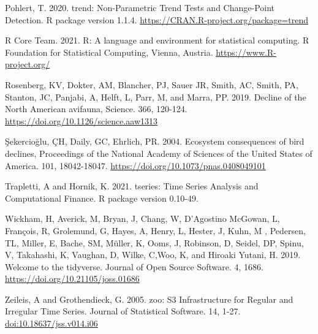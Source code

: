 \documentclass[
  12pt,
]{article}
\begin{document}
Pohlert, T. 2020. trend: Non-Parametric Trend Tests and Change-Point
Detection. R package version 1.1.4.
\url{https://CRAN.R-project.org/package=trend}

R Core Team. 2021. R: A language and environment for statistical
computing. R Foundation for Statistical Computing, Vienna, Austria.
\url{https://www.R-project.org/}

Rosenberg, KV, Dokter, AM, Blancher, PJ, Sauer JR, Smith, AC, Smith, PA,
Stanton, JC, Panjabi, A, Helft, L, Parr, M, and Marra, PP. 2019. Decline
of the North American avifauna, Science. 366, 120-124.
\url{https://doi.org/10.1126/science.aaw1313}

Şekercioğlu, ÇH, Daily, GC, Ehrlich, PR. 2004. Ecosystem consequences of
bird declines, Proceedings of the National Academy of Sciences of the
United States of America. 101, 18042-18047.
\url{https://doi.org/10.1073/pnas.0408049101}

Trapletti, A and Hornik, K. 2021. tseries: Time Series Analysis and
Computational Finance. R package version 0.10-49.

Wickham, H, Averick, M, Bryan, J, Chang, W, D'Agostino McGowan, L,
François, R, Grolemund, G, Hayes, A, Henry, L, Hester, J, Kuhn, M ,
Pedersen, TL, Miller, E, Bache, SM, Müller, K, Ooms, J, Robinson, D,
Seidel, DP, Spinu, V, Takahashi, K, Vaughan, D, Wilke, C,Woo, K, and
Hiroaki Yutani, H. 2019. Welcome to the tidyverse. Journal of Open
Source Software. 4, 1686. \url{https://doi.org/10.21105/joss.01686}

Zeileis, A and Grothendieck, G. 2005. zoo: S3 Infrastructure for Regular
and Irregular Time Series. Journal of Statistical Software. 14, 1-27.
\url{doi:10.18637/jss.v014.i06}
\end{document}
